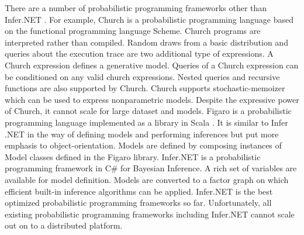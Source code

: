There are a number of probabilistic programming frameworks other than Infer.NET \cite{InferNET14}.
For example, 
Church \cite{GMR+08} is a probabilistic programming language based on the functional programming language Scheme.
Church programs are interpreted rather than compiled.
Random draws from a basic distribution and queries about the execution trace are two additional type of expressions. A Church expression defines a generative model. Queries of a Church expression can be conditioned on any valid church expressions. Nested queries and recursive functions are also supported by Church. Church supports stochastic-memoizer which can be used to express nonparametric models. 
Despite the expressive power of Church, it cannot scale for large dataset and models. 
Figaro is a probabilistic programming language implemented as a library in Scala \cite{Figaro}.
It is similar to Infer .NET in the way of defining models and performing inferences but put more emphasis to object-orientation. Models are defined by composing instances of Model classes defined in the Figaro library.
Infer.NET is a probabilistic programming framework in C\# for Bayesian Inference. A rich set of variables are available for model definition. Models are converted to a factor graph on which efficient built-in inference algorithms can be applied. %
Infer.NET is the best optimized probabilistic programming frameworks so far.
Unfortunately, all existing probabilistic programming frameworks including Infer.NET cannot scale out on to a distributed platform.

%







